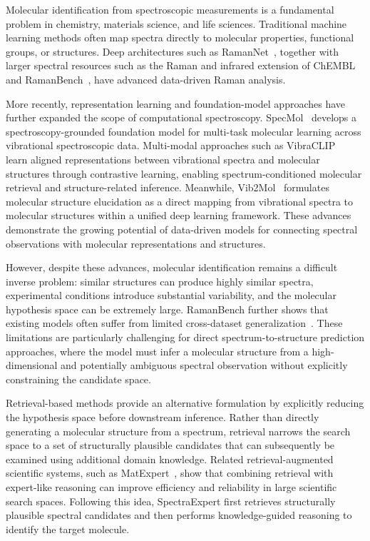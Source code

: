 \documentclass[conference]{IEEEtran}
\begin{document}
Molecular identification from spectroscopic measurements is a fundamental problem in chemistry, materials science, and life sciences. Traditional machine learning methods often map spectra directly to molecular properties, functional groups, or structures. Deep architectures such as RamanNet~\cite{ibtehaz2023ramannet}, together with larger spectral resources such as the Raman and infrared extension of ChEMBL~\cite{liang2025dataset} and RamanBench~\cite{koddenbrock2026ramanbench}, have advanced data-driven Raman analysis.

More recently, representation learning and foundation-model approaches have further expanded the scope of computational spectroscopy. SpecMol~\cite{shen2025specmol} develops a spectroscopy-grounded foundation model for multi-task molecular learning across vibrational spectroscopic data. Multi-modal approaches such as VibraCLIP~\cite{vibraclip} learn aligned representations between vibrational spectra and molecular structures through contrastive learning, enabling spectrum-conditioned molecular retrieval and structure-related inference. Meanwhile, Vib2Mol~\cite{vib2mol} formulates molecular structure elucidation as a direct mapping from vibrational spectra to molecular structures within a unified deep learning framework. These advances demonstrate the growing potential of data-driven models for connecting spectral observations with molecular representations and structures.

However, despite these advances, molecular identification remains a difficult inverse problem: similar structures can produce highly similar spectra, experimental conditions introduce substantial variability, and the molecular hypothesis space can be extremely large. RamanBench further shows that existing models often suffer from limited cross-dataset generalization~\cite{koddenbrock2026ramanbench}. These limitations are particularly challenging for direct spectrum-to-structure prediction approaches, where the model must infer a molecular structure from a high-dimensional and potentially ambiguous spectral observation without explicitly constraining the candidate space.

Retrieval-based methods provide an alternative formulation by explicitly reducing the hypothesis space before downstream inference. Rather than directly generating a molecular structure from a spectrum, retrieval narrows the search space to a set of structurally plausible candidates that can subsequently be examined using additional domain knowledge. Related retrieval-augmented scientific systems, such as MatExpert~\cite{ICLR2025_7d6850f4}, show that combining retrieval with expert-like reasoning can improve efficiency and reliability in large scientific search spaces. Following this idea, SpectraExpert first retrieves structurally plausible spectral candidates and then performs knowledge-guided reasoning to identify the target molecule.
\end{document}
